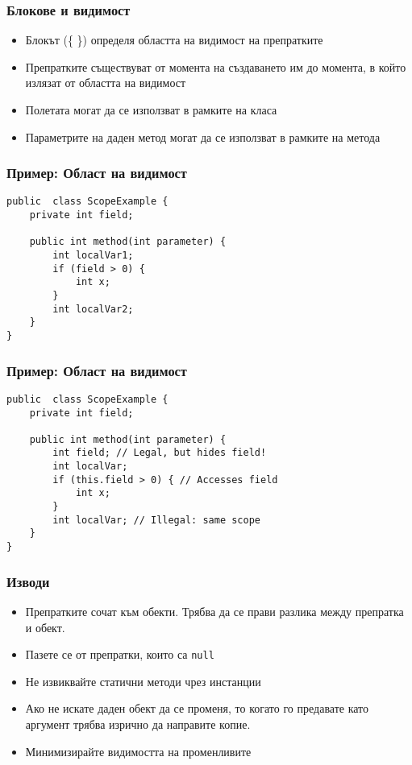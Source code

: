\documentclass[ignorenonframetext, hyperref=unicode,compress]{beamer}
\begin{document}
\begin{frame}[containsverbatim]\frametitle{Блокове и видимост}
\begin{itemize}
 \item Блокът (\{ \}) определя областта на видимост на препратките
 \item Препратките съществуват от момента на създаването им до момента, 
в който излязат от областта на видимост
 \item Полетата могат да се използват в рамките на класа
 \item Параметрите на даден метод могат да се използват в рамките на метода
\end{itemize}
\end{frame}

\begin{frame}[containsverbatim]\frametitle{Пример: Област на видимост}
\begin{lstlisting}
public  class ScopeExample {
 	private int field;

 	public int method(int parameter) {
 		int localVar1;
 		if (field > 0) {
 			int x;
		}
 		int localVar2;
	}
}
\end{lstlisting}
\end{frame}

\begin{frame}[containsverbatim]\frametitle{Пример: Област на видимост}
\begin{lstlisting}
public  class ScopeExample {
 	private int field;

 	public int method(int parameter) {
 		int field; // Legal, but hides field!
 		int localVar;
 		if (this.field > 0) { // Accesses field
 			int x;
		}
 		int localVar; // Illegal: same scope
	}
}
\end{lstlisting}
\end{frame}

\begin{frame}[containsverbatim]\frametitle{Изводи}
\begin{itemize}
 \item Препратките сочат към обекти. Трябва да се прави разлика между препратка и обект.
 \item Пазете се от препратки, които са \lstinline{null}
 \item Не извиквайте статични методи чрез инстанции
 \item Ако не искате даден обект да се променя, то когато го предавате като аргумент трябва изрично да направите копие.
 \item Минимизирайте видимостта на променливите
\end{itemize}
\end{frame}
\end{document}
